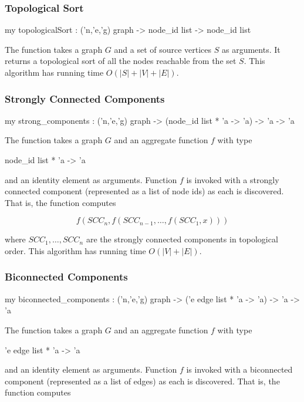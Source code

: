 \subsubsection{Topological Sort}
\begin{SML}
  my topologicalSort : ('n,'e,'g) graph -> node_id list -> node_id list
\end{SML}
   The function 
 takes a graph $G$ and a set of source vertices $S$
as arguments.  It returns a topological sort of all the nodes reachable from
the set $S$.  
This algorithm has running time $O(|S|+|V|+|E|)$.

\subsubsection{Strongly Connected Components}
\begin{SML}
 my strong_components : ('n,'e,'g) graph -> 
   (node_id list * 'a -> 'a) -> 'a -> 'a
\end{SML}
   The function  takes a graph $G$ and
an aggregate function $f$ with type 
\begin{SML}
  node_id list * 'a -> 'a
\end{SML}
\noindent and an identity element  as arguments.  
Function $f$ is invoked with a strongly connected component 
(represented as a list of node ids) as each is discovered.   
That is, the function  computes 

\[ 
   f(SCC_n,f(SCC_{n-1},\ldots, f(SCC_1,x)))
\] 

where $SCC_1,\ldots,SCC_n$ are the strongly connected components
in topological order.  This algorithm has running time $O(|V|+|E|)$.

\subsubsection{Biconnected Components}
\begin{SML}
 my biconnected_components : ('n,'e,'g) graph -> 
        ('e edge list * 'a -> 'a) -> 'a -> 'a
\end{SML}
   The function  takes a graph $G$ and
an aggregate function $f$ with type 
\begin{SML}
  'e edge list * 'a -> 'a
\end{SML}
\noindent and an identity element  as arguments.  
Function $f$ is invoked with a biconnected component 
(represented as a list of edges) as each is discovered.
That is, the function  computes 

